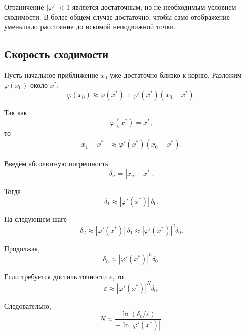 \documentclass[../final.tex]{subfiles}
\begin{document}
Ограничение $|\varphi'|<1$ является достаточным, но не необходимым
условием сходимости. В более общем случае достаточно, чтобы само
отображение уменьшало расстояние до искомой неподвижной точки.


\subsection{Скорость сходимости}

Пусть начальное приближение $x_0$ уже достаточно близко к корню.
Разложим $\varphi(x_0)$ около $x^*$:
%
\begin{equation*}
    \varphi(x_0)
    \approx
    \varphi(x^*)
    +
    \varphi'(x^*)(x_0-x^*).
\end{equation*}

Так как
%
\begin{equation*}
    \varphi(x^*)=x^*,
\end{equation*}
%
то
%
\begin{align*}
    x_1-x^*
    &\approx
    \varphi'(x^*)(x_0-x^*).
\end{align*}

Введём абсолютную погрешность
%
\begin{equation*}
    \delta_n=|x_n-x^*|.
\end{equation*}

Тогда
%
\begin{equation*}
    \delta_1
    \approx
    |\varphi'(x^*)|\,\delta_0.
\end{equation*}

На следующем шаге
%
\begin{equation*}
    \delta_2
    \approx
    |\varphi'(x^*)|\,\delta_1
    \approx
    |\varphi'(x^*)|^2\delta_0.
\end{equation*}

Продолжая,
%
\begin{equation*}
    \delta_n
    \approx
    |\varphi'(x^*)|^n\delta_0.
\end{equation*}

Если требуется достичь точности $\varepsilon$, то
%
\begin{equation*}
    \varepsilon
    \approx
    |\varphi'(x^*)|^N\delta_0.
\end{equation*}

Следовательно,
%
\begin{equation*}
    N
    \approx
    \frac{\ln(\delta_0/\varepsilon)}
    {-\ln|\varphi'(x^*)|}.
\end{equation*}
\end{document}
